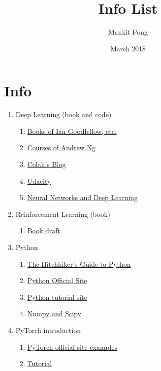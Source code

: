 \documentclass[12pt, a4paper]{article}
\title{Info List}
\author{Mankit Pong}
\date{March 2018}
\begin{document}
\maketitle

\section*{Info}

\begin{enumerate}
  \item Deep Learning (book and code)
    \begin{enumerate}
      \item \href{http://www.deeplearningbook.org/}{Books of Ian Goodfellow, etc.}
      \item \href{https://study.163.com/my?from=study&edusave=1#/smarts}{Courses of Andrew Ng}
      \item \href{https://colah.github.io/}{Colah's Blog}
      \item \href{https://www.udacity.com/}{Udacity}
      \item \href{http://neuralnetworksanddeeplearning.com/}{Neural Networks and Deep Learning}
    \end{enumerate}
  \item Reinforcement Learning (book)
    \begin{enumerate}
      \item \href{http://incompleteideas.net/}{Book draft}
    \end{enumerate}
  \item Python
    \begin{enumerate}
      \item \href{http://docs.python-guide.org/en/latest/}{The Hitchhiker’s Guide to Python}
      \item \href{https://www.python.org/}{Python Official Site}
      \item \href{https://pythonprogramming.net/}{Python tutorial site}
      \item \href{http://www.numpy.org/}{Numpy and Scipy}
    \end{enumerate}
  \item PyTorch introduction 
    \begin{enumerate}
      \item \href{http://pytorch.org/}{PyTorch official site examples}
      \item \href{http://pytorch.org/tutorials/index.html}{Tutorial}
    \end{enumerate}

\end{enumerate}
\end{document}
